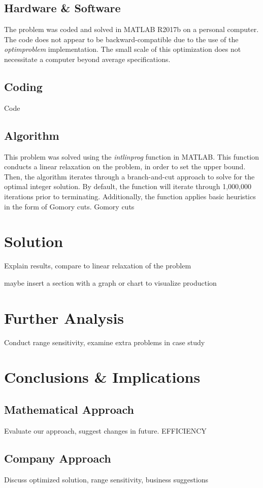 \documentclass{article}
\begin{document}
\subsection{Hardware \& Software}
The problem was coded and solved in MATLAB R2017b on a personal computer.  The code does not appear to be backward-compatible due to the use of the \textit{optimproblem} implementation.  The small scale of this optimization does not necessitate a computer beyond average specifications.
\subsection{Coding}
Code
\subsection{Algorithm}
This problem was solved using the \textit{intlinprog} function in MATLAB.  This function conducts a linear relaxation on the problem, in order to set the upper bound.  Then, the algorithm iterates through a branch-and-cut approach to solve for the optimal integer solution.  By default, the function 
will iterate through 1,000,000 iterations prior to terminating.  Additionally, the function applies basic heuristics in the form of Gomory cuts.  Gomory cuts 
\section{Solution}
Explain results, compare to linear relaxation of the problem
\par
maybe insert a section with a graph or chart to visualize production
\section{Further Analysis}
Conduct range sensitivity, examine extra problems in case study
\section{Conclusions \& Implications}
\subsection{Mathematical Approach}
Evaluate our approach, suggest changes in future.  EFFICIENCY
\subsection{Company Approach}
Discuss optimized solution, range sensitivity, business suggestions
	\newpage
	\begin{thebibliography}{9}

\end{thebibliography}
\end{document}
